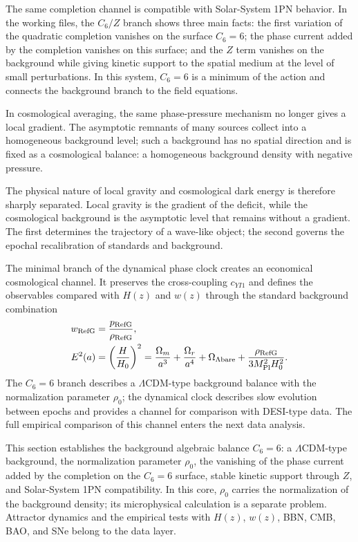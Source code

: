 \documentclass[12pt]{article}
\begin{document}
The same completion channel is compatible with Solar-System 1PN behavior. In the working files, the $C_6/Z$ branch shows three main facts: the first variation of the quadratic completion vanishes on the surface $C_6=6$; the phase current added by the completion vanishes on this surface; and the $Z$ term vanishes on the background while giving kinetic support to the spatial medium at the level of small perturbations. In this system, $C_6=6$ is a minimum of the action and connects the background branch to the field equations.

In cosmological averaging, the same phase-pressure mechanism no longer gives a local gradient. The asymptotic remnants of many sources collect into a homogeneous background level; such a background has no spatial direction and is fixed as a cosmological balance: a homogeneous background density with negative pressure.

The physical nature of local gravity and cosmological dark energy is therefore sharply separated. Local gravity is the gradient of the deficit, while the cosmological background is the asymptotic level that remains without a gradient. The first determines the trajectory of a wave-like object; the second governs the epochal recalibration of standards and background.

The minimal branch of the dynamical phase clock creates an economical cosmological channel. It preserves the cross-coupling $c_{YI1}$ and defines the observables compared with $H(z)$ and $w(z)$ through the standard background combination
\begin{align}
w_{\rm RefG} &= \frac{p_{\rm RefG}}{\rho_{\rm RefG}}, \\
E^2(a) &= \left(\frac{H}{H_0}\right)^2
=\frac{\Omega_m}{a^3}+\frac{\Omega_r}{a^4}
+\Omega_{\Lambda{\rm bare}}
+\frac{\rho_{\rm RefG}}{3M_{\rm Pl}^2H_0^2}.
\end{align}
The $C_6=6$ branch describes a $\Lambda$CDM-type background balance with the normalization parameter $\rho_0$; the dynamical clock describes slow evolution between epochs and provides a channel for comparison with DESI-type data. The full empirical comparison of this channel enters the next data analysis.

This section establishes the background algebraic balance $C_6=6$: a $\Lambda$CDM-type background, the normalization parameter $\rho_0$, the vanishing of the phase current added by the completion on the $C_6=6$ surface, stable kinetic support through $Z$, and Solar-System 1PN compatibility. In this core, $\rho_0$ carries the normalization of the background density; its microphysical calculation is a separate problem. Attractor dynamics and the empirical tests with $H(z)$, $w(z)$, BBN, CMB, BAO, and SNe belong to the data layer.
\end{document}
